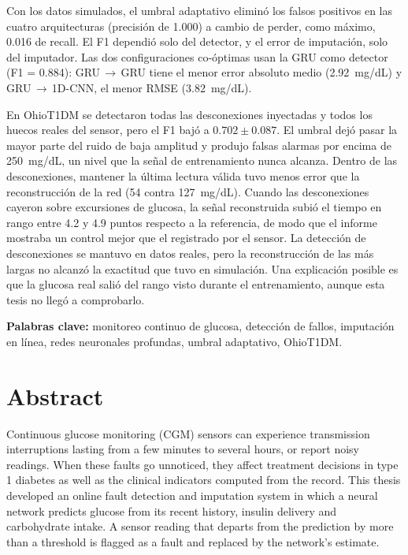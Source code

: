 \documentclass{report}
\begin{document}
Con los datos simulados, el umbral adaptativo eliminó los falsos positivos en las cuatro arquitecturas (precisión de 1.000) a cambio de perder, como máximo, 0.016 de recall. El F1 dependió solo del detector, y el error de imputación, solo del imputador. Las dos configuraciones co-óptimas usan la GRU como detector (F1 = 0.884): GRU\,$\rightarrow$\,GRU tiene el menor error absoluto medio (2.92~mg/dL) y GRU\,$\rightarrow$\,1D-CNN, el menor RMSE (3.82~mg/dL).

En OhioT1DM se detectaron todas las desconexiones inyectadas y todos los huecos reales del sensor, pero el F1 bajó a $0.702 \pm 0.087$. El umbral dejó pasar la mayor parte del ruido de baja amplitud y produjo falsas alarmas por encima de 250~mg/dL, un nivel que la señal de entrenamiento nunca alcanza. Dentro de las desconexiones, mantener la última lectura válida tuvo menos error que la reconstrucción de la red (54 contra 127~mg/dL). Cuando las desconexiones cayeron sobre excursiones de glucosa, la señal reconstruida subió el tiempo en rango entre 4.2 y 4.9 puntos respecto a la referencia, de modo que el informe mostraba un control mejor que el registrado por el sensor. La detección de desconexiones se mantuvo en datos reales, pero la reconstrucción de las más largas no alcanzó la exactitud que tuvo en simulación. Una explicación posible es que la glucosa real salió del rango visto durante el entrenamiento, aunque esta tesis no llegó a comprobarlo.

\vspace{0.5cm}
\noindent\textbf{Palabras clave:} monitoreo continuo de glucosa, detección de fallos, imputación en línea, redes neuronales profundas, umbral adaptativo, OhioT1DM.

\chapter*{Abstract}

Continuous glucose monitoring (CGM) sensors can experience transmission interruptions lasting from a few minutes to several hours, or report noisy readings. When these faults go unnoticed, they affect treatment decisions in type 1 diabetes as well as the clinical indicators computed from the record. This thesis developed an online fault detection and imputation system in which a neural network predicts glucose from its recent history, insulin delivery and carbohydrate intake. A sensor reading that departs from the prediction by more than a threshold is flagged as a fault and replaced by the network's estimate.
\end{document}
